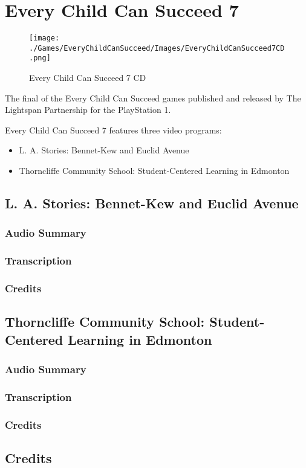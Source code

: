 \chapter{Every Child Can Succeed 7}

\begin{figure}[H]
    \centering
    \texttt{[image: ./Games/EveryChildCanSucceed/Images/EveryChildCanSucceed7CD.png]}
    \caption{Every Child Can Succeed 7 CD}
\end{figure}

The final of the Every Child Can Succeed games published and released by The Lightspan Partnership for the PlayStation 1.

Every Child Can Succeed 7 features three video programs:

\begin{itemize}
    \item L. A. Stories: Bennet-Kew and Euclid Avenue
    \item Thorncliffe Community School: Student-Centered Learning in Edmonton
\end{itemize}

\clearpage
\newpage

\section{L. A. Stories: Bennet-Kew and Euclid Avenue}

\subsection{Audio Summary}

\subsection{Transcription}

\subsection{Credits}

\section{Thorncliffe Community School: Student-Centered Learning in Edmonton}

\subsection{Audio Summary}

\subsection{Transcription}

\subsection{Credits}

\section{Credits}